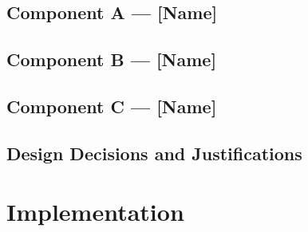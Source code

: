 \documentclass[11pt]{article}
\newif\ifguidance
\newcommand{\guidance}[1]{\ifguidance\textcolor{blue}{\small\textit{[#1]}}\fi}
\begin{document}
\begin{multicols}{2}

\subsection{Component A --- [Name]}

\guidance{%
  Describe this component's role in the system, its inputs and outputs,
  and why it was chosen over alternatives. Keep this at the design level
  --- save low-level implementation details for Section~\ref{sec:implementation}.}


\subsection{Component B --- [Name]}


\subsection{Component C --- [Name]}


\subsection{Design Decisions and Justifications}

\guidance{%
  Summarise the key design trade-offs you made and why. This helps
  demonstrate that the overall design is coherent and well-motivated
  rather than arbitrary.}



\section{Implementation}
\label{sec:implementation}

\guidance{%
  MARKING: This section is worth 20 marks. The marker will assess:
  (1) whether a significant amount of implementation work has been done,
  and (2) whether the resulting system functions well and is of
  appropriate complexity. Focus on \emph{how} you built the system:
  technical details, libraries/APIs used, algorithms, data structures,
  challenges encountered and how you solved them. Include code snippets,
  pseudocode, or detailed descriptions where they help convey complexity
  and effort. If you compared alternative implementations, describe the
  comparison and rationale.}


\end{multicols}
\end{document}
